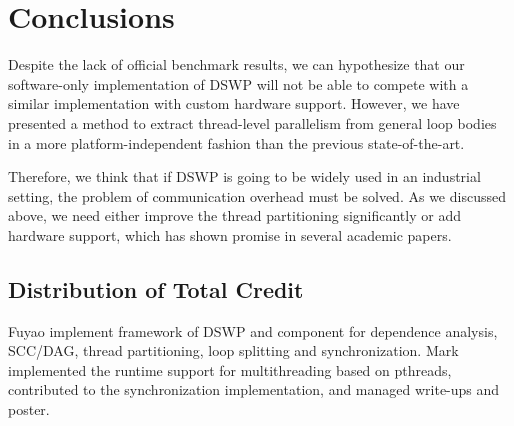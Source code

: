 \documentclass[11pt, letter]{article}
\begin{document}
\section{Conclusions}
Despite the lack of official benchmark results, we can hypothesize that our software-only implementation of DSWP will not be able to compete with a similar implementation with custom hardware support.  However, we have presented a method to extract thread-level parallelism from general loop bodies in a more platform-independent fashion than the previous state-of-the-art.

Therefore, we think that if DSWP is going to be widely used in an industrial setting, the problem of communication overhead must be solved. As we discussed above, we need either improve the thread partitioning significantly or add hardware support,  which has shown promise in several academic papers. 




\subsection*{Distribution of Total Credit}
Fuyao implement framework of DSWP and component for dependence analysis, SCC/DAG, thread partitioning, loop splitting and synchronization. Mark implemented the runtime support for multithreading based on pthreads, contributed to the synchronization implementation, and managed write-ups and poster.
\end{document}
